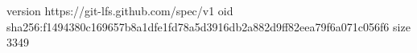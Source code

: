 version https://git-lfs.github.com/spec/v1
oid sha256:f1494380c169657b8a1dfe1fd78a5d3916db2a882d9ff82eea79f6a071c056f6
size 3349
